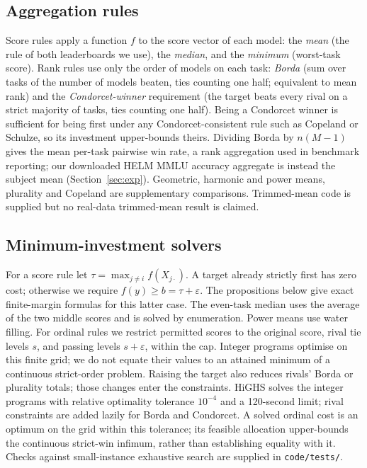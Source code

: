 \documentclass{article}
\begin{document}
\subsection{Aggregation rules}
\label{sec:rules}
Score rules apply a function $f$ to the score vector of each model: the \emph{mean} (the rule of both leaderboards we use), the \emph{median}, and the \emph{minimum} (worst-task score). Rank rules use only the order of models on each task: \emph{Borda} (sum over tasks of the number of models beaten, ties counting one half; equivalent to mean rank) and the \emph{Condorcet-winner} requirement (the target beats every rival on a strict majority of tasks, ties counting one half). Being a Condorcet winner is sufficient for being first under any Condorcet-consistent rule such as Copeland or Schulze, so its investment upper-bounds theirs. Dividing Borda by $n(M-1)$ gives the mean per-task pairwise win rate, a rank aggregation used in benchmark reporting; our downloaded HELM MMLU accuracy aggregate is instead the subject mean (Section~\ref{sec:exp}). Geometric, harmonic and power means, plurality and Copeland are supplementary comparisons. Trimmed-mean code is supplied but no real-data trimmed-mean result is claimed.

\subsection{Minimum-investment solvers}
\label{sec:solvers}
For a score rule let $\tau=\max_{j\neq i}f(X_{j\cdot})$. A target already strictly first has zero cost; otherwise we require $f(y)\ge b=\tau+\varepsilon$. The propositions below give exact finite-margin formulas for this latter case. The even-task median uses the average of the two middle scores and is solved by enumeration. Power means use water filling. For ordinal rules we restrict permitted scores to the original score, rival tie levels $s$, and passing levels $s+\varepsilon$, within the cap. Integer programs optimise on this finite grid; we do not equate their values to an attained minimum of a continuous strict-order problem. Raising the target also reduces rivals' Borda or plurality totals; those changes enter the constraints. HiGHS solves the integer programs with relative optimality tolerance $10^{-4}$ and a 120-second limit; rival constraints are added lazily for Borda and Condorcet. A solved ordinal cost is an optimum on the grid within this tolerance; its feasible allocation upper-bounds the continuous strict-win infimum, rather than establishing equality with it. Checks against small-instance exhaustive search are supplied in \texttt{code/tests/}.
\end{document}
